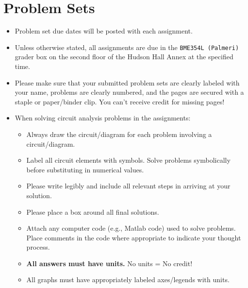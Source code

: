 \section{Problem Sets}
\begin{itemize}
    \item Problem set due dates will be posted with each assignment.  
    \item Unless otherwise stated, all assignments are due in the \verb+BME354L (Palmeri)+ 
        grader box on the second floor of the Hudson Hall Annex at the
        specified time.  
    \item Please make sure that your submitted problem sets are clearly labeled
        with your name, problems are clearly numbered, and the pages are
        secured with a staple or paper/binder clip.  You can't receive credit
        for missing pages!
    \item When solving circuit analysis problems in the assignments:
        \begin{itemize}
            \item Always draw the circuit/diagram for each problem involving a
                circuit/diagram.
            \item Label all circuit elements with symbols.  Solve problems
                symbolically before substituting in numerical values.
            \item Please write legibly and include all relevant steps in
                arriving at your solution.
            \item Please place a box around all final solutions.
            \item Attach any computer code (e.g., Matlab code) used to solve
                problems.  Place comments in the code where appropriate to
                indicate your thought process.
            \item \textbf{All answers must have units.}  No units = No credit!
            \item All graphs must have appropriately labeled axes/legends with
                units.
        \end{itemize}
\end{itemize}
